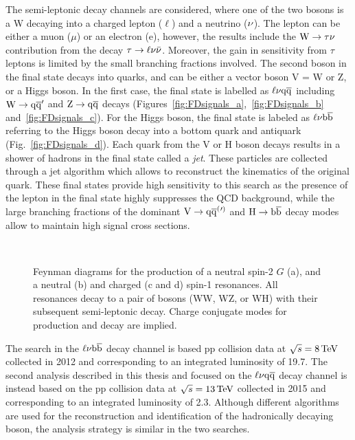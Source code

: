 The semi-leptonic decay channels are considered, where one of the two bosons is a W decaying into a charged lepton ($\ell$) and a neutrino ($\nu$).
The lepton can be either a muon ($\mu$) or an electron (e), however, the results include the $\mathrm{W}\to\tau\nu$ contribution from the decay $\tau\to\ell\nu\bar{\nu}$.
Moreover, the gain in sensitivity from $\tau$ leptons is limited by the small branching fractions involved.
The second boson in the final state decays into quarks, and can be either a vector boson V = W or Z,
or a Higgs boson. In the first case, the final state is labelled as $\ell\nu\mathrm{q}\overline{\mathrm{q}}$ including $\mathrm{W}\to\mathrm{q}\overline{\mathrm{q}}^\prime$ and $\mathrm{Z}\to\mathrm{q}\overline{\mathrm{q}}$ decays (Figures~\ref{fig:FDsignals_a},~\ref{fig:FDsignals_b} and~\ref{fig:FDsignals_c}).
For the Higgs boson, the final state is labeled as $\ell\nu{\mathrm{b}\overline{\mathrm{b}}}$ referring to the Higgs boson decay into a bottom quark and antiquark (Fig.~\ref{fig:FDsignals_d}).
Each quark from the V or H boson decays results in a shower of hadrons in the final state called a \textit{jet}. These particles are collected through a jet algorithm which allows to reconstruct the kinematics of the original quark.
These final states provide high sensitivity to this search as the presence of the lepton in the final state highly suppresses the QCD background, while the large branching fractions of the dominant $\mathrm{V}\to\mathrm{q}\overline{\mathrm{q}}^({}'^){}$ and $\mathrm{H}\to{\mathrm{b}\overline{\mathrm{b}}}$ decay modes allow to maintain high signal cross sections.

\begin{figure}[!htb]
\centering
{}\hspace{1cm}
\\
\hspace{1cm}
\caption{Feynman diagrams for the production of a neutral spin-2 $G$ (a), and a neutral \Zpr (b) and charged \Wpr (c and d) spin-1 resonances.
All resonances decay to a pair of bosons (WW, WZ, or WH) with their subsequent semi-leptonic decay. Charge conjugate modes for \Wpr production and decay are implied.}
\label{fig:FDsignals}
\end{figure}

The search in the $\ell\nu{\mathrm{b}\overline{\mathrm{b}}}$ decay channel is based pp collision data at $\sqrt{s} = 8\,\text{Te\hspace{-.08em}V}$ collected in 2012 and corresponding to an integrated luminosity of 19.7\fbinv.
The second analysis described in this thesis and focused on the $\ell\nu\mathrm{q}\overline{\mathrm{q}}$ decay channel is instead based on the pp collision data at $\sqrt{s} = 13\,\text{Te\hspace{-.08em}V}$
collected in 2015 and corresponding to an integrated luminosity of 2.3\fbinv.
Although different algorithms are used for the reconstruction and identification of the hadronically decaying boson, the analysis strategy is similar in the two searches.\\


